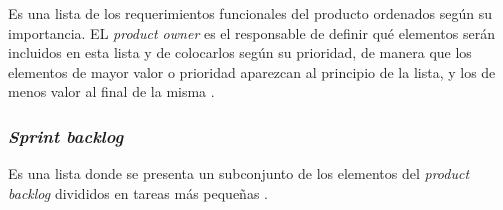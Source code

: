 Es una lista de los requerimientos funcionales del producto ordenados según su importancia. EL \textit{product owner} es el responsable de definir qué elementos serán incluidos en esta lista y de colocarlos según su prioridad, de manera que los elementos de mayor valor o prioridad aparezcan al principio de la lista, y los de menos valor al final de la misma \cite{SCRM2}. 

\subsubsection{\textit{Sprint backlog}}

Es una lista donde se presenta un subconjunto de los elementos del \textit{product backlog} divididos en tareas más pequeñas \cite{SCRM2}. 


